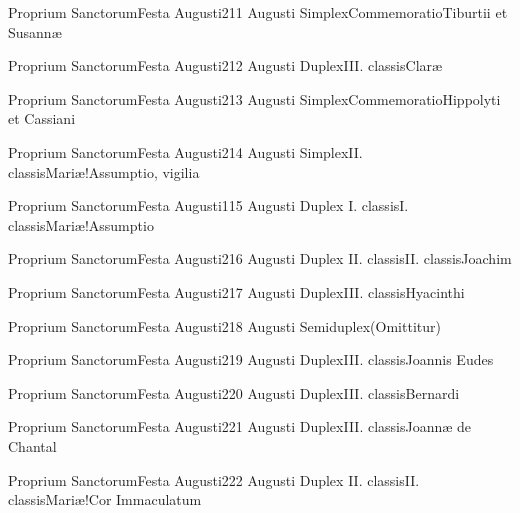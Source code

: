 \documentclass[invitatoriale-romanum.tex]{subfiles}
\begin{document}
	{Proprium Sanctorum}{Festa Augusti}{2}{11 Augusti}
	{Simplex}{Commemoratio}{Tiburtii et Susannæ}
	{}
	{\invitferia}

	{Proprium Sanctorum}{Festa Augusti}{2}{12 Augusti}
	{Duplex}{III. classis}{Claræ}
	{}
	{}

	{Proprium Sanctorum}{Festa Augusti}{2}{13 Augusti}
	{Simplex}{Commemoratio}{Hippolyti et Cassiani}
	{}
	{\invitferia}

	{Proprium Sanctorum}{Festa Augusti}{2}{14 Augusti}
	{Simplex}{II. classis}{Mariæ!Assumptio, vigilia}
	{}
	{}
\invitferia

	{Proprium Sanctorum}{Festa Augusti}{1}{15 Augusti}
	{Duplex I. classis}{I. classis}{Mariæ!Assumptio}
	{}
	{}

	{Proprium Sanctorum}{Festa Augusti}{2}{16 Augusti}
	{Duplex II. classis}{II. classis}{Joachim}
	{}
	{}

	{Proprium Sanctorum}{Festa Augusti}{2}{17 Augusti}
	{Duplex}{III. classis}{Hyacinthi}
	{}
	{}

	{Proprium Sanctorum}{Festa Augusti}{2}{18 Augusti}
	{Semiduplex}{(Omittitur)}{}
	{}
	{\invitferia}

	{Proprium Sanctorum}{Festa Augusti}{2}{19 Augusti}
	{Duplex}{III. classis}{Joannis Eudes}
	{}
	{}

	{Proprium Sanctorum}{Festa Augusti}{2}{20 Augusti}
	{Duplex}{III. classis}{Bernardi}
	{}
	{}

	{Proprium Sanctorum}{Festa Augusti}{2}{21 Augusti}
	{Duplex}{III. classis}{Joannæ de Chantal}
	{}
	{}

	{Proprium Sanctorum}{Festa Augusti}{2}{22 Augusti}
	{Duplex II. classis}{II. classis}{Mariæ!Cor Immaculatum}
	{}
	{}
\end{document}
